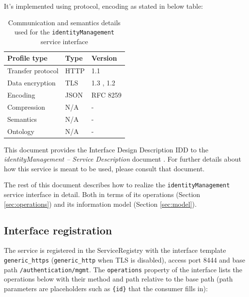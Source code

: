 \documentclass[a4paper]{arrowhead}
\begin{document}
It's implemented using protocol, encoding as stated in below table:
\begin{table}[ht!]
  \centering
  \begin{tabular}{|l|l|l|}
    \hline
    \rowcolor{gray!33} Profile type & Type & Version \\ \hline
    Transfer protocol & HTTP & 1.1 \cite{rfc9112} \\ \hline
    Data encryption & TLS & 1.3 \cite{rfc8446}, 1.2 \cite{rfc5246} \\ \hline
    Encoding & JSON & RFC 8259 \cite{rfc8259} \\ \hline
    Compression & N/A & - \\ \hline
    Semantics & N/A & - \\ \hline
    Ontology & N/A & - \\ \hline
  \end{tabular}
  \caption{Communication and semantics details used for the \texttt{identityManagement} service interface}
  \label{tab:comunication_semantics_profile}
\end{table}

This document provides the Interface Design Description IDD to the \textit{identityManagement -- Service Description} document \cite{auth-identityManagement-sd}.
For further details about how this service is meant to be used, please consult that document.

The rest of this document describes how to realize the \texttt{identityManagement} service
interface in detail. Both in terms of its operations (Section \ref{sec:operations}) and its information model (Section \ref{sec:model}).

\subsection{Interface registration}

The service is registered in the ServiceRegistry with the interface template \texttt{generic\_\allowbreak{}https} (\texttt{generic\_\allowbreak{}http} when TLS is disabled), access port 8444 and base path \texttt{/\allowbreak{}authentication/\allowbreak{}mgmt}. The \texttt{operations} property of the interface lists the operations below with their method and path relative to the base path (path parameters are placeholders such as \texttt{\{id\}} that the consumer fills in):
\end{document}
